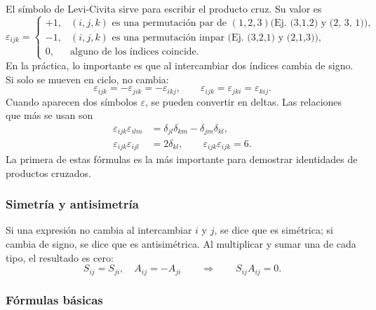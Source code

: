 El símbolo de Levi-Civita sirve para escribir el producto cruz. Su valor es
\[
\varepsilon_{ijk}=
\begin{cases}
+1,& (i,j,k)\text{ es una permutación par de }(1,2,3) \text{(Ej. (3,1,2) y (2, 3, 1))},\\
-1,& (i,j,k)\text{ es una permutación impar (Ej. (3,2,1) y (2,1,3))},\\
0,& \text{alguno de los índices coincide}.
\end{cases}
\]
En la práctica, lo importante es que al intercambiar dos índices cambia de signo. Si solo se mueven en ciclo, no cambia:
\[
\varepsilon_{ijk}=-\varepsilon_{jik}=-\varepsilon_{ikj},
\qquad
\varepsilon_{ijk}=\varepsilon_{jki}=\varepsilon_{kij}.
\]
Cuando aparecen dos símbolos $\varepsilon$, se pueden convertir en deltas. Las relaciones que más se usan son
\begin{align*}
\varepsilon_{ijk}\varepsilon_{ilm}
  &=\delta_{jl}\delta_{km}-\delta_{jm}\delta_{kl},\\
\varepsilon_{ijk}\varepsilon_{ijl}
  &=2\delta_{kl},
\qquad
\varepsilon_{ijk}\varepsilon_{ijk}=6.
\end{align*}
La primera de estas fórmulas es la más importante para demostrar identidades de productos cruzados.

\subsubsection*{Simetría y antisimetría}

Si una expresión no cambia al intercambiar $i$ y $j$, se dice que es simétrica; si cambia de signo, se dice que es antisimétrica. Al multiplicar y sumar una de cada tipo, el resultado es cero:
\[
S_{ij}=S_{ji},\quad A_{ij}=-A_{ji}
\qquad\Longrightarrow\qquad
S_{ij}A_{ij}=0.
\]

\subsubsection*{Fórmulas básicas}

